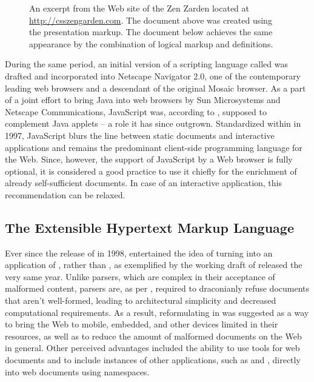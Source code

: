 \documentclass{book}
\begin{document}
\begin{figure}
  \inputminted{html}{examples/02/presentation-markup.html}
  \caption{An excerpt from the Web site of the  Zen Zarden
    located at \protect\url{http://csszengarden.com}. The document above was
    created using the  presentation markup. The document below
    achieves the same appearance by the combination of logical markup and
     definitions.}\bigskip
  \inputminted{html}{examples/02/logical-markup.html}
\end{figure}

During the same period, an initial version of a scripting language called
 was drafted and incorporated into Netscape Navigator 2.0, one
of the contemporary leading web browsers and a descendant of the original Mosaic
browser. As a part of a joint effort to bring Java into web browsers by Sun
Microsystems and Netscape Communications, JavaScript was, according to
\cite{js-announcement}, supposed to complement Java applets -- a role it has
since outgrown. Standardized within \cite{ecma1} in 1997, JavaScript blurs the
line between static documents and interactive applications and remains the
predominant client-side programming language for the Web. Since, however, the
support of JavaScript by a Web browser is fully optional, it is considered a
good practice to use it chiefly for the enrichment of already self-sufficient
 documents. In case of an interactive application, this
recommendation can be relaxed.

\subsection{The Extensible Hypertext Markup Language}
Ever since the release of  in 1998,  entertained the
idea of turning  into an application of , rather than
, as exemplified by the working draft of \cite{raggett98} released
the very same year. Unlike  parsers, which are complex in their
acceptance of malformed content,  parsers are, as per
\cite[Section~1.2, Terminology]{bray98}, required to draconianly refuse
 documents that aren't well-formed, leading to architectural
simplicity and decreased computational requirements. As a result, reformulating
 in  was suggested as a way to bring the Web to
mobile, embedded, and other devices limited in their resources, as well as to
reduce the amount of malformed documents on the Web in general. Other perceived
advantages included the ability to use  tools for web documents and
to include instances of other  applications, such as
 and , directly into web documents using
 namespaces.
\end{document}
